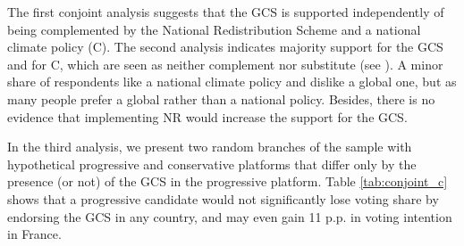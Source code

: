 The first conjoint analysis suggests that the GCS is supported independently of being complemented by the National Redistribution Scheme and a national climate policy (C). %
The second analysis indicates majority support for the GCS and for C, which are seen as neither complement nor substitute (see ). A minor share of respondents like a national climate policy and dislike a global one, but as many people prefer a global rather than a national policy. Besides, there is no evidence that implementing NR would increase the support for the GCS.


In the third analysis, we present two random branches of the sample with hypothetical progressive and conservative platforms that differ only by the presence (or not) of the GCS in the progressive platform. Table \ref{tab:conjoint_c} shows that a progressive candidate would not significantly lose voting share by endorsing the GCS in any country, and may even gain 11 p.p. in voting intention in France. %


